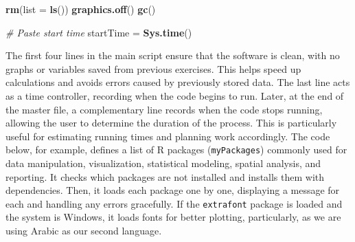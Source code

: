 \documentclass[
]{article}
\newenvironment{Shaded}{\begin{snugshade}}{\end{snugshade}}
\newcommand{\AttributeTok}[1]{\textcolor[rgb]{0.13,0.29,0.53}{#1}}
\newcommand{\CommentTok}[1]{\textcolor[rgb]{0.56,0.35,0.01}{\textit{#1}}}
\newcommand{\FunctionTok}[1]{\textcolor[rgb]{0.13,0.29,0.53}{\textbf{#1}}}
\newcommand{\NormalTok}[1]{#1}
\newcommand{\OtherTok}[1]{\textcolor[rgb]{0.56,0.35,0.01}{#1}}
\begin{document}
\begin{Shaded}
\begin{Highlighting}[]
\FunctionTok{rm}\NormalTok{(}\AttributeTok{list =} \FunctionTok{ls}\NormalTok{())}
\FunctionTok{graphics.off}\NormalTok{()}
\FunctionTok{gc}\NormalTok{()}

\CommentTok{\# Paste start time}
\NormalTok{startTime  }\OtherTok{=} \FunctionTok{Sys.time}\NormalTok{()}
\end{Highlighting}
\end{Shaded}

The first four lines in the main script ensure that the software is
clean, with no graphs or variables saved from previous exercises. This
helps speed up calculations and avoids errors caused by previously
stored data. The last line acts as a time controller, recording when the
code begins to run. Later, at the end of the master file, a
complementary line records when the code stops running, allowing the
user to determine the duration of the process. This is particularly
useful for estimating running times and planning work accordingly. The
code below, for example, defines a list of R packages
(\texttt{myPackages}) commonly used for data manipulation,
visualization, statistical modeling, spatial analysis, and reporting. It
checks which packages are not installed and installs them with
dependencies. Then, it loads each package one by one, displaying a
message for each and handling any errors gracefully. If the
\texttt{extrafont} package is loaded and the system is Windows, it loads
fonts for better plotting, particularly, as we are using Arabic as our
second language.
\end{document}
